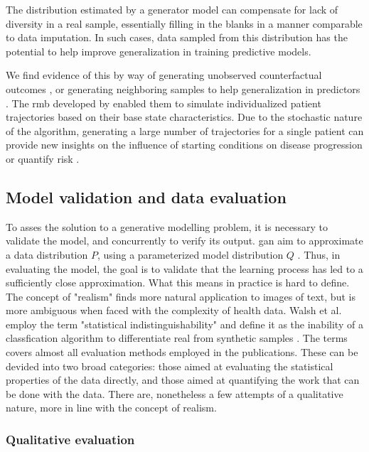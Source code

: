         The distribution estimated by a generator model can compensate for lack of diversity in a real sample, essentially filling in the blanks in a manner comparable to data imputation. In such cases, data sampled from this distribution has the potential to help improve generalization in training predictive models.\par 
        
        We find evidence of this by way of generating unobserved counterfactual outcomes \cite{yoon2018imputation}, or generating neighboring samples to help generalization in predictors \cite{Che_2017}. The \gls{rmb} developed by \citeauthor{Fisher2019} enabled them to simulate individualized patient trajectories based on their base state characteristics. Due to the stochastic nature of the algorithm, generating a large number of trajectories for a single patient can provide new insights on the influence of starting conditions on disease progression or quantify risk \cite{Fisher2019}.
        
    \subsection{Model validation and data evaluation}

        To asses the solution to a generative modelling problem, it is necessary to validate the model, and concurrently to verify its output. \gls{gan} aim to approximate a data distribution $P$, using a parameterized model distribution $Q$ \cite{Borji2018-fy}. Thus, in evaluating the model, the goal is to validate that the learning process has led to a sufficiently close approximation. What this means in practice is hard to define. The concept of "realism" finds more natural application to images of text, but is more ambiguous when faced with the complexity of health data. Walsh et al. employ the term "statistical indistinguishability" and define it as the inability of a classfication algorithm to differentiate real from synthetic samples \cite{walsh2020generating}. The terms covers almost all evaluation methods employed in the publications. These can be devided into two broad categories: those aimed at evaluating the statistical properties of the data directly, and those aimed at quantifying the work that can be done with the data.  There are, nonetheless a few attempts of a qualitative nature, more in line with the concept of realism. 

        \subsubsection{Qualitative evaluation}


